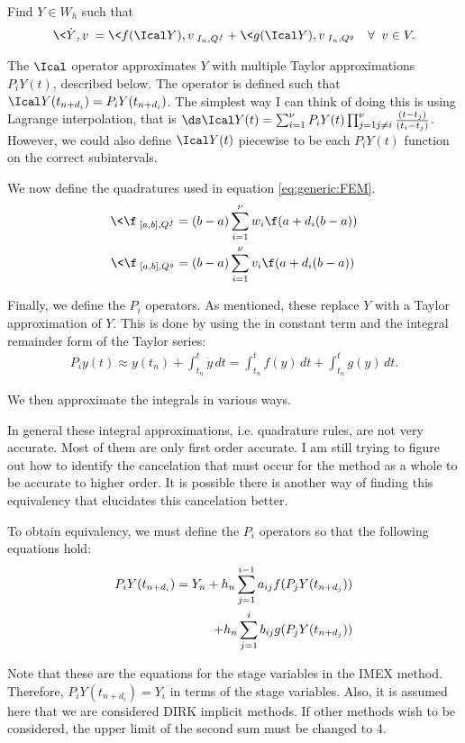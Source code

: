 \documentclass{amsart}
\begin{document}
Find $Y \in W_h$ such that 
\begin{align}
	\< \dot{Y} , v\> = \< f(\Ical Y),v\>_{I_n,Q^f} + \< g(\Ical Y),v\>_{I_n,Q^g} \quad \forall \;\; v \in V. \label{eq:generic:FEM}
\end{align}

The $\Ical$ operator approximates $Y$ with multiple Taylor approximations $P_iY(t)$, described below.  The operator is defined such that $\Ical Y(t_{n+d_i}) = P_iY(t_{n+d_i})$.  The simplest way I can think of doing this is using Lagrange interpolation, that is $\ds \Ical Y(t) = \sum_{i=1}^\nu P_iY(t) \prod_{j=1\\j \neq i}^\nu \frac{(t-t_j)}{(t_i-t_j)}$.  However, we could also define $\Ical Y(t)$ piecewise to be each $P_iY(t)$ function on the correct subintervals.


We now define the quadratures used in equation \eqref{eq:generic:FEM}.
\begin{align}
	\<\f \>_{[a,b],Q^f} &= (b-a)\sum_{i=1}^\nu w_i \f(a+d_i(b-a)) \\
	\< \f \>_{[a,b],Q^g} &= (b-a)\sum_{i=1}^\nu v_i \f(a + d_i(b-a))
\end{align}

Finally, we define the $P_i$ operators.  As mentioned, these replace $Y$ with a Taylor approximation of $Y$.  This is done by using the in constant term and the integral remainder form of the Taylor series:
\begin{align}
	P_iy(t) \approx y(t_n) + \int_{t_n}^t \dot{y} \, dt = \int_{t_n}^t f(y)\,dt + \int_{t_n}^t g(y)\,dt. \label{eq:Taylor:exact}
\end{align}

We then approximate the integrals in various ways.
\begin{rem}
	In general these integral approximations, i.e. quadrature rules, are not very accurate.  Most of them are only first order accurate.  I am still trying to figure out how to identify the cancelation that must occur for the method as a whole to be accurate to higher order.  It is possible there is another way of finding this equivalency that elucidates this cancelation better.	
\end{rem}
To obtain equivalency, we must define the $P_i$ operators so that the following equations hold:
\begin{align}
	P_iY(t_{n+d_i}) = Y_n	+ h_n \sum_{j=1}^{i-1} a_{ij}f(P_jY(t_{n+d_j})) \label{eq:Pi:cond}\\
	\hspace{.3in} + h_n \sum_{j=1}^i b_{ij}g(P_jY(t_{n+d_j})) \notag
\end{align}
\begin{rem}
	Note that these are the equations for the stage variables in the IMEX method.  Therefore, $P_iY(t_{n+d_i}) = Y_i$ in terms of the stage variables.  Also, it is assumed here that we are considered DIRK implicit methods.  If other methods wish to be considered, the upper limit of the second sum must be changed to 4.	
\end{rem}
\end{document}
